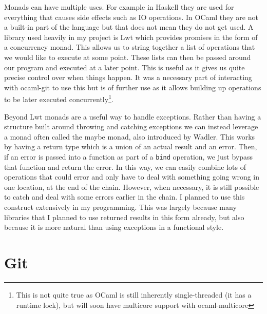 Monads can have multiple uses. For example in Haskell they are used for everything that causes side effects such as IO operations. In OCaml they are not a built-in part of the language but that does not mean they do not get used. A library used heavily in my project is Lwt\cite{code_lwt} which provides promises\cite{Liskov1988} in the form of a concurrency monad. This allows us to string together a list of operations that we would like to execute at some point. These lists can then be passed around our program and executed at a later point. This is useful as it gives us quite precise control over when things happen. It was a necessary part of interacting with ocaml-git to use this but is of further use as it allows building up operations to be later executed concurrently\footnote{This is not quite true as OCaml is still inherently single-threaded (it has a runtime lock), but will soon have multicore support with ocaml-multicore\cite{dolan2014multicore}}.

Beyond Lwt monads are a useful way to handle exceptions. Rather than having a structure built around throwing and catching exceptions we can instead leverage a monad often called the maybe monad, also introduced by Wadler\cite{wadler90monads}. This works by having a return type which is a union of an actual result and an error. Then, if an error is passed into a function as part of a \texttt{bind} operation, we just bypass that function and return the error. In this way, we can easily combine lots of operations that could error and only have to deal with something going wrong in one location, at the end of the chain. However, when necessary, it is still possible to catch and deal with some errors earlier in the chain. I planned to use this construct extensively in my programming. This was largely because many libraries that I planned to use returned results in this form already, but also because it is more natural than using exceptions in a functional style.

\section{Git}

